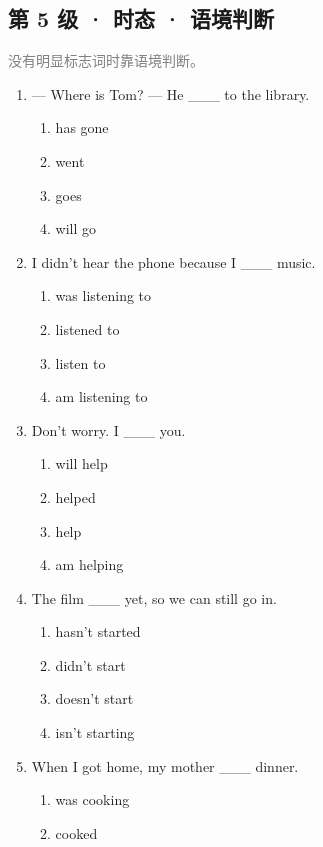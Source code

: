 \documentclass[11pt,a4paper]{ctexart}
\begin{document}
\subsection*{第 5 级 · 时态 · 语境判断}
\noindent\textcolor{gray}{没有明显标志词时靠语境判断。}\par\smallskip
\begin{enumerate}[leftmargin=*,itemsep=4pt]
\item — Where is Tom? — He \_\_\_ to the library.
\begin{enumerate}[label=\Alph*.,leftmargin=2em,itemsep=1pt,topsep=2pt]
\item has gone
\item went
\item goes
\item will go
\end{enumerate}
\item I didn’t hear the phone because I \_\_\_ music.
\begin{enumerate}[label=\Alph*.,leftmargin=2em,itemsep=1pt,topsep=2pt]
\item was listening to
\item listened to
\item listen to
\item am listening to
\end{enumerate}
\item Don’t worry. I \_\_\_ you.
\begin{enumerate}[label=\Alph*.,leftmargin=2em,itemsep=1pt,topsep=2pt]
\item will help
\item helped
\item help
\item am helping
\end{enumerate}
\item The film \_\_\_ yet, so we can still go in.
\begin{enumerate}[label=\Alph*.,leftmargin=2em,itemsep=1pt,topsep=2pt]
\item hasn’t started
\item didn’t start
\item doesn’t start
\item isn’t starting
\end{enumerate}
\item When I got home, my mother \_\_\_ dinner.
\begin{enumerate}[label=\Alph*.,leftmargin=2em,itemsep=1pt,topsep=2pt]
\item was cooking
\item cooked

\end{enumerate}
\end{enumerate}
\end{document}

